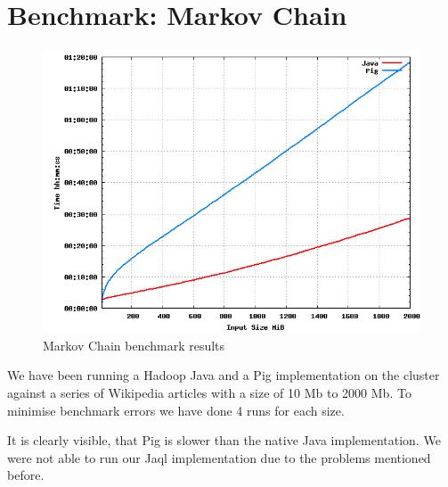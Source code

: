 \section{Benchmark: Markov Chain}

\begin{figure}[tb]
  \begin{center}
    \includegraphics[width=\textwidth]{../benchmarks/markov}
  \end{center}
  \caption{Markov Chain benchmark results}
  \label{fig:reducers}
\end{figure}

We have been running a Hadoop Java and a Pig implementation on the cluster against a series of Wikipedia articles with a size of 10 Mb to 2000 Mb. To minimise benchmark errors we have done 4 runs for each size.

It is clearly visible, that Pig is slower than the native Java implementation. We were not able to run our Jaql implementation due to the problems mentioned before.